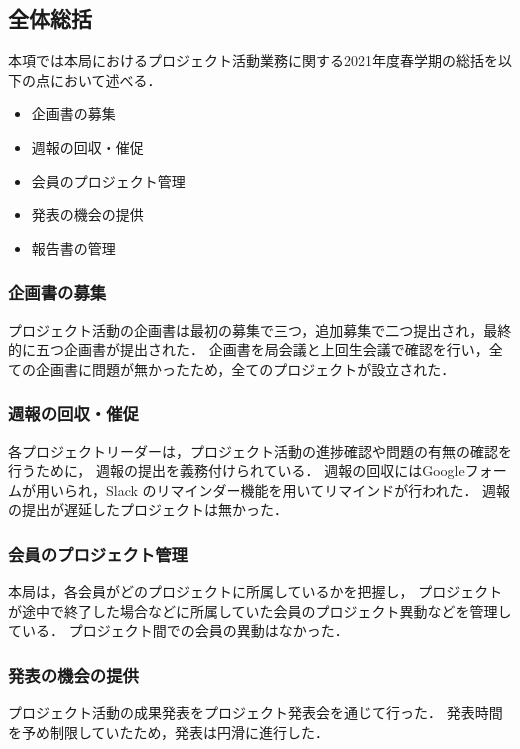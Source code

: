 \subsection*{全体総括}



本項では本局におけるプロジェクト活動業務に関する2021年度春学期の総括を以下の点において述べる．

\begin{itemize}
\item 企画書の募集
\item 週報の回収・催促
\item 会員のプロジェクト管理
\item 発表の機会の提供
\item 報告書の管理
\end{itemize}

\subsubsection*{企画書の募集}

プロジェクト活動の企画書は最初の募集で三つ，追加募集で二つ提出され，最終的に五つ企画書が提出された．
企画書を局会議と上回生会議で確認を行い，全ての企画書に問題が無かったため，全てのプロジェクトが設立された．

\subsubsection*{週報の回収・催促}

各プロジェクトリーダーは，プロジェクト活動の進捗確認や問題の有無の確認を行うために，
週報の提出を義務付けられている．
週報の回収にはGoogleフォームが用いられ，Slack のリマインダー機能を用いてリマインドが行われた．
週報の提出が遅延したプロジェクトは無かった．

\subsubsection*{会員のプロジェクト管理}

本局は，各会員がどのプロジェクトに所属しているかを把握し，
プロジェクトが途中で終了した場合などに所属していた会員のプロジェクト異動などを管理している．
プロジェクト間での会員の異動はなかった．

\subsubsection*{発表の機会の提供}

プロジェクト活動の成果発表をプロジェクト発表会を通じて行った．
発表時間を予め制限していたため，発表は円滑に進行した．
